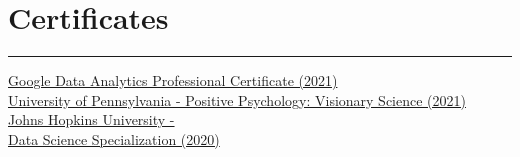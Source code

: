 \documentclass[]{meetresume-class}
\begin{document}
\begin{minipage}[t]{0.33\textwidth}
		\section{Certificates}
		\noindent\rule{5cm}{0.6pt}
		
		\href{https://coursera.org/share/76b19df91a43554894965d5aa7a82254}{Google Data Analytics Professional Certificate (2021) \ExternalLink}\\
		\href{https://coursera.org/share/34576e12fe5880c5e3382c8a91b56564}{University of Pennsylvania - Positive Psychology: Visionary Science (2021) \ExternalLink}\\
		\href{https://coursera.org/share/3dbc74a447f9ca4efc319aefd14efa33}{Johns Hopkins University - \\Data Science Specialization (2020) \ExternalLink}\\
		
	\end{minipage} 
	\hfill
\end{document}
